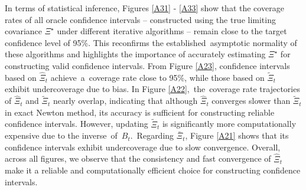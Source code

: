 In terms of statistical inference, Figures \ref{A31} - \ref{A33} show that the coverage rates of all oracle confidence intervals -- constructed using the true limiting covariance $\Xi^\star$ under different iterative algorithms -- remain close to the target confidence level of 95\%. This reconfirms the established~asymptotic normality of these algorithms and highlights the importance of accurately estimating $\Xi^\star$ for constructing valid confidence intervals. 
From Figure \ref{A23}, confidence intervals based on $\hat{\Xi}_t$ achieve~a~coverage rate close to 95\%, while those based on $\tilde{\Xi}_t$ exhibit undercoverage due to bias. In Figure \ref{A22},~the~coverage rate trajectories of $\hat{\Xi}_t$ and $\tilde{\Xi}_t$ nearly overlap, indicating that although $\hat{\Xi}_t$ converges slower than $\tilde{\Xi}_t$ in exact Newton method, its accuracy is sufficient for constructing reliable confidence intervals. However, updating $\tilde{\Xi}_t$ is significantly more computationally expensive due to the inverse~of~$B_t$.~Regarding $\bar{\Xi}_t$, Figure \ref{A21} shows that its confidence intervals exhibit undercoverage due to slow convergence. 
Overall, across all figures, we observe that the consistency and fast convergence of $\hat{\Xi}_t$ make it a reliable and computationally efficient choice for constructing confidence intervals.



